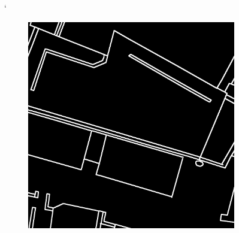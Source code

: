 \documentclass[12pt]{article}
\begin{document}
\begin{figure}[H]
 `
	\vspace{-3mm}
	\setcounter{subfigure}{0}
	
 
    \begin{subfigure}[b]{.235\textwidth}
		
		\begin{minipage}[t]{1\linewidth}
			\centering
			\includegraphics[width=1\linewidth]{images/patches/gt1.png}
			\caption{ }
		\end{minipage}
	\end{subfigure}
	\begin{subfigure}[b]{.235\textwidth}
		\begin{minipage}[t]{1\linewidth}
			\centering

\end{minipage}
\end{subfigure}
\end{figure}
\end{document}
